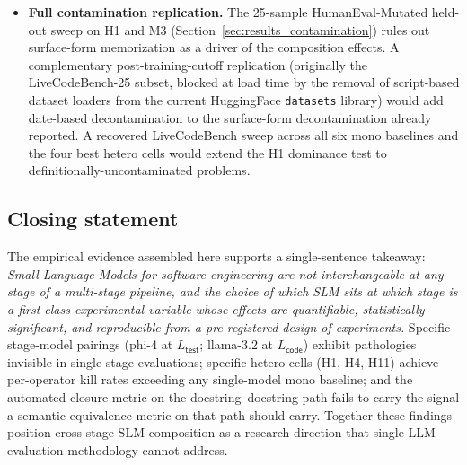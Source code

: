 \begin{itemize}
  \item \textbf{Full contamination replication.} The 25-sample HumanEval-Mutated held-out sweep on H1 and M3 (Section~\ref{sec:results_contamination}) rules out surface-form memorization as a driver of the composition effects. A complementary post-training-cutoff replication (originally the LiveCodeBench-25 subset, blocked at load time by the removal of script-based dataset loaders from the current HuggingFace \texttt{datasets} library) would add date-based decontamination to the surface-form decontamination already reported. A recovered LiveCodeBench sweep across all six mono baselines and the four best hetero cells would extend the H1 dominance test to definitionally-uncontaminated problems.
\end{itemize}

\subsection{Closing statement}

The empirical evidence assembled here supports a single-sentence takeaway: \emph{Small Language Models for software engineering are not interchangeable at any stage of a multi-stage pipeline, and the choice of which SLM sits at which stage is a first-class experimental variable whose effects are quantifiable, statistically significant, and reproducible from a pre-registered design of experiments.} Specific stage-model pairings (phi-4 at $L_{\textsf{test}}$; llama-3.2 at $L_{\textsf{code}}$) exhibit pathologies invisible in single-stage evaluations; specific hetero cells (H1, H4, H11) achieve per-operator kill rates exceeding any single-model mono baseline; and the automated closure metric on the docstring--docstring path fails to carry the signal a semantic-equivalence metric on that path should carry. Together these findings position cross-stage SLM composition as a research direction that single-LLM evaluation methodology cannot address.

